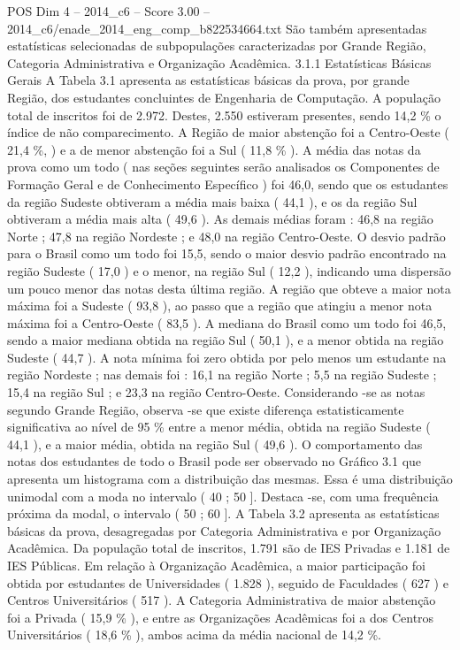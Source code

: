 \begin{textsample}{POS Dim 4 – 2014\_c6 – Score 3.00 – 2014\_c6/enade\_2014\_eng\_comp\_b822534664.txt}
São também apresentadas estatísticas selecionadas de subpopulações caracterizadas por Grande Região, Categoria Administrativa e Organização Acadêmica. 3.1.1 Estatísticas Básicas Gerais A Tabela 3.1 apresenta as estatísticas básicas da prova, por grande Região, dos estudantes concluintes de Engenharia de Computação.
A população total de inscritos foi de 2.972.
Destes, 2.550 estiveram presentes, sendo 14,2 \% o índice de não comparecimento.
A Região de maior abstenção foi a Centro-Oeste ( 21,4 \%, ) e a de menor abstenção foi a Sul ( 11,8 \% ).
A média das notas da prova como um todo ( nas seções seguintes serão analisados os Componentes de Formação Geral e de Conhecimento Específico ) foi 46,0, sendo que os estudantes da região Sudeste obtiveram a média mais baixa ( 44,1 ), e os da região Sul obtiveram a média mais alta ( 49,6 ).
As demais médias foram : 46,8 na região Norte ; 47,8 na região Nordeste ; e 48,0 na região Centro-Oeste.
O desvio padrão para o Brasil como um todo foi 15,5, sendo o maior desvio padrão encontrado na região Sudeste ( 17,0 ) e o menor, na região Sul ( 12,2 ), indicando uma dispersão um pouco menor das notas desta última região.
A região que obteve a maior nota máxima foi a Sudeste ( 93,8 ), ao passo que a região que atingiu a menor nota máxima foi a Centro-Oeste ( 83,5 ).
A mediana do Brasil como um todo foi 46,5, sendo a maior mediana obtida na região Sul ( 50,1 ), e a menor obtida na região Sudeste ( 44,7 ).
A nota mínima foi zero obtida por pelo menos um estudante na região Nordeste ; nas demais foi : 16,1 na região Norte ; 5,5 na região Sudeste ; 15,4 na região Sul ; e 23,3 na região Centro-Oeste.
Considerando -se as notas segundo Grande Região, observa -se que existe diferença estatisticamente significativa ao nível de 95 \% entre a menor média, obtida na região Sudeste ( 44,1 ), e a maior média, obtida na região Sul ( 49,6 ).
O comportamento das notas dos estudantes de todo o Brasil pode ser observado no Gráfico 3.1 que apresenta um histograma com a distribuição das mesmas.
Essa é uma distribuição unimodal com a moda no intervalo ( 40 ; 50 ].
Destaca -se, com uma frequência próxima da modal, o intervalo ( 50 ; 60 ].
A Tabela 3.2 apresenta as estatísticas básicas da prova, desagregadas por Categoria Administrativa e por Organização Acadêmica.
Da população total de inscritos, 1.791 são de IES Privadas e 1.181 de IES Públicas.
Em relação à Organização Acadêmica, a maior participação foi obtida por estudantes de Universidades ( 1.828 ), seguido de Faculdades ( 627 ) e Centros Universitários ( 517 ).
A Categoria Administrativa de maior abstenção foi a Privada ( 15,9 \% ), e entre as Organizações Acadêmicas foi a dos Centros Universitários ( 18,6 \% ), ambos acima da média nacional de 14,2 \%.

\end{textsample}
